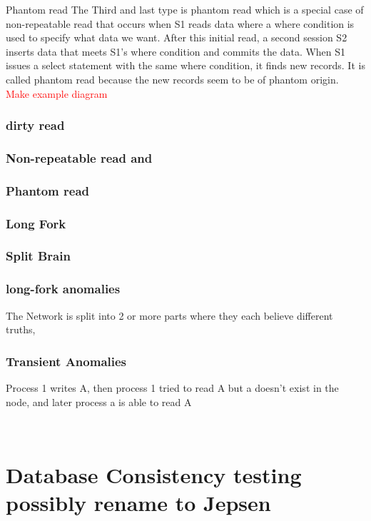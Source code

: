 \documentclass[a4paper,10pt,titlepage]{report}
\begin{document}
Phantom read
The Third and last type is phantom read which is a special case of non-repeatable read that occurs when S1 reads data where a where condition is used to specify what data we want. After this initial read, a second session S2 inserts data that meets S1's where condition and commits the data. When S1 issues a select statement with the same where condition, it finds new records. It is called phantom read because the new records seem to be of phantom origin.
 \textcolor{red}{Make example diagram}


\subsection{dirty read}
\subsection{Non-repeatable read and}
\subsection{Phantom read}

\subsection{Long Fork}

\subsection{Split Brain}

\subsection{long-fork anomalies}

The Network is split into 2 or more parts where they each believe different truths,


\subsection{Transient Anomalies}

Process 1 writes A, then process 1 tried to read A but a doesn't exist in the node, and later process a is able to read A

\


\chapter{Database Consistency testing possibly rename to Jepsen}
\end{document}
